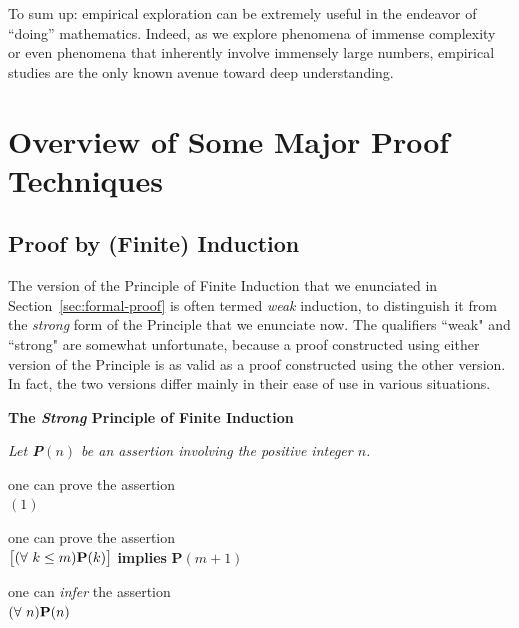 \medskip

To sum up: empirical exploration can be extremely useful in the endeavor of ``doing'' mathematics.  Indeed, as we explore phenomena of immense complexity or even phenomena that inherently involve immensely large numbers, empirical studies are the only known avenue toward deep understanding.


\section{Overview of Some Major Proof Techniques}
\label{sec:major-proof-techniques}

\subsection{Proof by (Finite) Induction}
\label{sec:Induction}

The version of the Principle of Finite Induction that we enunciated in Section~\ref{sec:formal-proof} is often termed {\em weak} induction, to distinguish it from the {\em strong} form of the Principle that we enunciate now.  The qualifiers ``weak" and ``strong" are somewhat unfortunate, because a proof constructed using either version of the Principle is as valid as a proof constructed using the other version.  In fact, the two versions differ mainly in their ease of use in various situations.

\bigskip

 

\noindent 
\hspace*{.1in}\begin{minipage}{0.95\textwidth}
{\bf The {\em Strong} Principle of Finite Induction}

{\em
Let {\bf P}$(n)$ be an assertion involving the positive integer $n$.

\hspace*{.15in}{\bf if} one can prove the assertion \\
\hspace*{.35in}{\bf P}$(1)$

\hspace*{.15in}{\bf and} one can prove the assertion \\
\hspace*{.35in}$\big[ (\forall \ k \leq m)\mbox{\bf P}(k) \big]$ {\bf implies} {\bf P}$(m+1)$

\hspace*{.15in}{\bf then} one can {\em infer} the assertion \\
\hspace*{.35in}$(\forall \ n) \mbox{\bf P}(n)$
}
\end{minipage}

